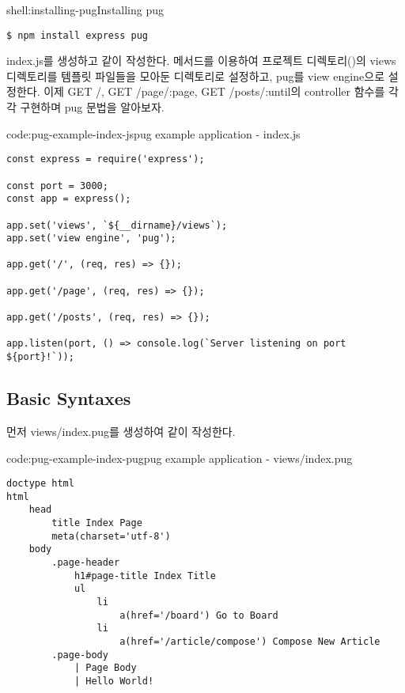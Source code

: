 \begin{shell}{shell:installing-pug}{Installing pug}
\begin{verbatim}
$ npm install express pug
\end{verbatim}
\end{shell}

index.js를 생성하고 \와 같이 작성한다.  메서드를 이용하여 프로젝트 디렉토리()의 views 디렉토리를 템플릿 파일들을 모아둔 디렉토리로 설정하고, pug를 view engine으로 설정한다. 이제 GET /, GET /page/:page, GET /posts/:until의 controller 함수를 각각 구현하며 pug 문법을 알아보자.

\begin{code}{code:pug-example-index-js}{pug example application - index.js}
\begin{verbatim}
const express = require('express');

const port = 3000;
const app = express();

app.set('views', `${__dirname}/views`);
app.set('view engine', 'pug');

app.get('/', (req, res) => {});

app.get('/page', (req, res) => {});

app.get('/posts', (req, res) => {});

app.listen(port, () => console.log(`Server listening on port ${port}!`));
\end{verbatim}
\end{code}

\subsection*{Basic Syntaxes}

먼저 views/index.pug를 생성하여 \와 같이 작성한다.

\begin{code}{code:pug-example-index-pug}{pug example application - views/index.pug}
\begin{verbatim}
doctype html
html
    head
        title Index Page
        meta(charset='utf-8')
    body
        .page-header
            h1#page-title Index Title
            ul
                li
                    a(href='/board') Go to Board
                li
                    a(href='/article/compose') Compose New Article
        .page-body
            | Page Body
            | Hello World!
\end{verbatim}
\end{code}

